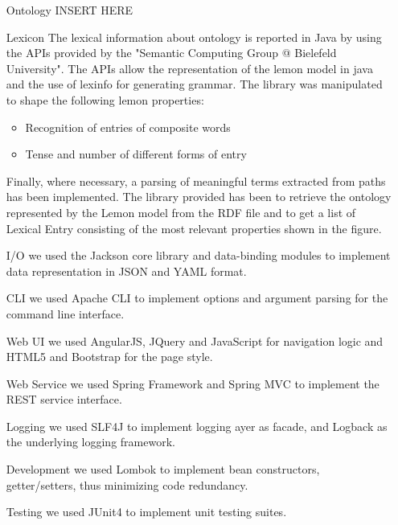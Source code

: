 \begin{itemize}
	\item[Ontology] INSERT HERE
	
	\item[Lexicon] The lexical information about ontology is reported in Java by using the APIs provided by the "Semantic Computing Group @ Bielefeld University". The APIs allow the representation of the lemon model in java and the use of lexinfo for generating grammar. The library was manipulated to shape the following lemon properties: 
	\begin{itemize}
		\item Recognition of entries of composite words
		\item Tense and number of different forms of entry 
	\end{itemize}	
Finally, where necessary, a parsing of meaningful terms extracted from paths has been implemented.
The library provided has been to retrieve the ontology represented by the Lemon model from the RDF file and to get a list of Lexical Entry consisting of the most relevant properties shown in the figure.

	\item[I/O] we used the Jackson core library and data-binding modules to implement data representation in JSON and YAML format.
	
	\item[CLI] we used Apache CLI to implement options and argument parsing for the command line interface.
	
	\item[Web UI] we used AngularJS, JQuery and JavaScript for navigation logic and HTML5 and Bootstrap for the page style.
	
	\item[Web Service] we used Spring Framework and Spring MVC to implement the REST service interface.
	
	\item[Logging] we used SLF4J to implement logging ayer as facade, and Logback as the underlying logging framework.
	
	\item[Development] we used Lombok to implement bean constructors, getter/setters, thus minimizing code redundancy.
	
	\item[Testing] we used JUnit4 to implement unit testing suites.
\end{itemize}

